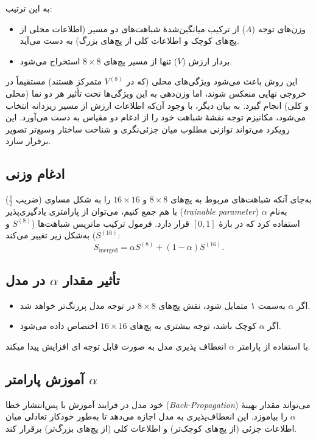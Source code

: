 به این ترتیب:
\begin{itemize}
	\item وزن‌های توجه (\(A\)) از ترکیب میانگین‌شدهٔ شباهت‌های دو مسیر (اطلاعات محلی از پچ‌های کوچک و اطلاعات کلی از پچ‌های بزرگ) به دست می‌آید.
	\item بردار ارزش (\(V\)) تنها از مسیر پچ‌های \(8 \times 8\) استخراج می‌شود.
\end{itemize}

این روش باعث می‌شود ویژگی‌های محلی (که در \(V^{(8)}\) متمرکز هستند) مستقیماً در خروجی نهایی منعکس شوند، اما وزن‌دهی به این ویژگی‌ها تحت تأثیر هر دو نما (محلی و کلی) انجام گیرد. به بیان دیگر، با وجود آن‌که اطلاعات ارزش از مسیر ریزدانه انتخاب می‌شود، مکانیزم توجه نقشهٔ شباهت خود را از ادغام دو مقیاس به دست می‌آورد. این رویکرد می‌تواند توازنی مطلوب میان جزئی‌نگری و شناخت ساختار وسیع‌تر تصویر برقرار سازد.

\subsection{ادغام وزنی}



به‌جای آنکه شباهت‌های مربوط به پچ‌های \(8 \times 8\) و \(16 \times 16\) را به شکل مساوی (ضریب \(\frac{1}{2}\)) با هم جمع کنیم، می‌توان از پارامتری یادگیری‌پذیر (\textit{trainable parameter}) به‌نام \(\alpha\) استفاده کرد که در بازهٔ \([0, 1]\) قرار دارد. فرمول ترکیب ماتریس شباهت‌ها (\(S^{(8)}\) و \(S^{(16)}\)) به‌شکل زیر تغییر می‌کند:
\[
S_{\text{merged}} = \alpha S^{(8)} + (1 - \alpha) S^{(16)}.
\]

\subsection*{تأثیر مقدار \(\alpha\) در مدل}
\begin{itemize}
	\item اگر \(\alpha\) به‌سمت ۱ متمایل شود، نقش پچ‌های \(8 \times 8\) در توجه مدل پررنگ‌تر خواهد شد.
	\item اگر \(\alpha\) کوچک باشد، توجه بیشتری به پچ‌های \(16 \times 16\) اختصاص داده می‌شود.
\end{itemize}

با استفاده از پارامتر \(\alpha\) انعطاف پذیری مدل به صورت قابل توجه ای افزایش پیدا میکند.

\subsection*{آموزش پارامتر \(\alpha\)}
خود مدل در فرایند آموزش با پس‌انتشار خطا (\textit{Back-Propagation}) می‌تواند مقدار بهینهٔ \(\alpha\) را بیاموزد. این انعطاف‌پذیری به مدل اجازه می‌دهد تا به‌طور خودکار تعادلی میان اطلاعات جزئی (از پچ‌های کوچک‌تر) و اطلاعات کلی (از پچ‌های بزرگ‌تر) برقرار کند.


